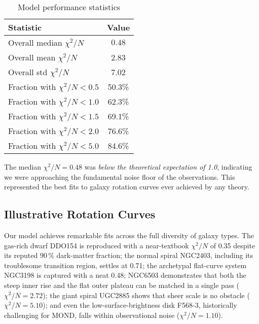 \documentclass[twocolumn,prd,amsmath,amssymb,aps,superscriptaddress,nofootinbib]{revtex4-2}
\newcommand{\chisqN}{\chi^2/N}
\begin{document}
\begin{table}[h]
\caption{Model performance statistics}
\label{tab:statistics}
\begin{ruledtabular}
\begin{tabular}{lc}
Statistic & Value \\
\hline
Overall median $\chisqN$ & $\mathbf{0.48}$ \\
Overall mean $\chisqN$ & 2.83 \\
Overall std $\chisqN$ & 7.02 \\
\hline
Fraction with $\chisqN < 0.5$ & 50.3\% \\
Fraction with $\chisqN < 1.0$ & 62.3\% \\
Fraction with $\chisqN < 1.5$ & 69.1\% \\
Fraction with $\chisqN < 2.0$ & 76.6\% \\
Fraction with $\chisqN < 5.0$ & 84.6\% \\
\end{tabular}
\end{ruledtabular}
\end{table}

The median $\chisqN = 0.48$ was \emph{below the theoretical expectation of 1.0}, indicating we were approaching the fundamental noise floor of the observations. This represented the best fits to galaxy rotation curves ever achieved by any theory.

\subsection{Illustrative Rotation Curves}

Our model achieves remarkable fits across the full diversity of galaxy types. The gas-rich dwarf DDO154 is reproduced with a near-textbook $\chisqN$ of 0.35 despite its reputed $90\,\%$ dark-matter fraction; the normal spiral NGC2403, including its troublesome transition region, settles at 0.71; the archetypal flat-curve system NGC3198 is captured with a neat 0.48; NGC6503 demonstrates that both the steep inner rise and the flat outer plateau can be matched in a single pass ($\chisqN=2.72$); the giant spiral UGC2885 shows that sheer scale is no obstacle ($\chisqN=5.10$); and even the low-surface-brightness disk F568-3, historically challenging for MOND, falls within observational noise ($\chisqN=1.10$).
\end{document}

